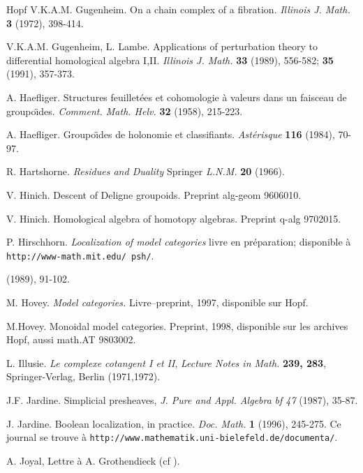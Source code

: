 \documentclass[12pt]{article}
\begin{document}
\begin{thebibliography}{Hopf}
V.K.A.M. Gugenheim. On a chain complex of a fibration. {\em Illinois J. Math.}
{\bf 3} (1972), 398-414.

V.K.A.M. Gugenheim, L. Lambe. Applications of perturbation theory to
differential homological algebra I,II. {\em Illinois J. Math.} {\bf 33} (1989),
556-582; {\bf 35} (1991), 357-373.

A. Haefliger. Structures feuillet\'ees et cohomologie \`a valeurs dans
un faisceau de groupo\"{\i}des. {\em Comment. Math. Helv.} {\bf 32} (1958),
215-223.

A. Haefliger. Groupo\"{\i}des de holonomie et classifiants. {\em
Ast\'erisque} {\bf 116} (1984),
70-97.


R. Hartshorne. {\em Residues and Duality} Springer {\em L.N.M.} {\bf 20}
(1966).

V. Hinich. Descent of Deligne groupoids. Preprint alg-geom 9606010.

V. Hinich. Homological algebra of homotopy algebras. Preprint q-alg 9702015.

P. Hirschhorn. {\em Localization of model categories}
livre en pr\'eparation; disponible \`a
{\tt http://www-math.mit.edu/~psh/}.

(1989), 91-102.

M. Hovey. {\em Model categories.} Livre--preprint, 1997, disponible
sur Hopf.

M.Hovey. Monoidal model categories. Preprint, 1998, disponible sur les
archives Hopf,
aussi math.AT 9803002.

L. Illusie. {\em Le complexe cotangent I et II}, {\em  Lecture Notes in
Math.} {\bf 239, 283}, Springer-Verlag, Berlin (1971,1972).

J.F. Jardine.  Simplicial presheaves, {\em J. Pure and Appl. Algebra} {\em
bf 47}
(1987), 35-87.

J. Jardine. Boolean localization, in practice. {\em Doc. Math.} {\bf 1} (1996),
245-275. Ce journal se trouve \`a
{\tt http://www.mathematik.uni-bielefeld.de/documenta/}.

A. Joyal, Lettre \`a A. Grothendieck (cf \cite{Jardine}).


\end{thebibliography}
\end{document}
